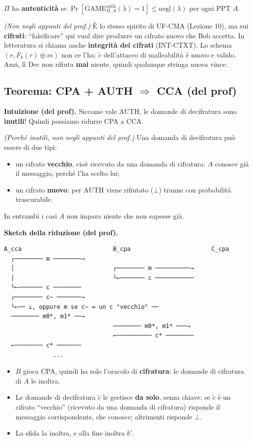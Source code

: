 \(\Pi\) ha \textbf{autenticità} se \(\Pr[\text{GAME}^{\text{auth}}_{\Pi, A}(\lambda) = 1] \le \text{negl}(\lambda)\) per ogni PPT \(A\).

\begin{nota}
\emph{(Non negli appunti del prof.)} È lo stesso spirito di UF-CMA (Lezione 10), ma sui \textbf{cifrati}: ``falsificare'' qui vuol dire produrre un cifrato nuovo che Bob accetta. In letteratura si chiama anche \textbf{integrità dei cifrati} (INT-CTXT). Lo schema \((r, F_k(r) \oplus m)\) non ce l'ha: \(\tilde{c}\) dell'attacco di malleabilità è nuovo e valido. Anzi, lì Dec non rifiuta \textbf{mai} niente, quindi qualunque stringa nuova vince.
\end{nota}

\subsection{Teorema: CPA + AUTH \texorpdfstring{\(\Rightarrow\)}{=>} CCA (del prof)}

\textbf{Intuizione (del prof).} Siccome vale AUTH, le domande di decifratura sono \textbf{inutili}! Quindi possiamo ridurre CPA a CCA.

\emph{(Perché inutili, non negli appunti del prof.)} Una domanda di decifratura può essere di due tipi:
\begin{itemize}
  \item un cifrato \textbf{vecchio}, cioè ricevuto da una domanda di cifratura: \(A\) conosce già il messaggio, perché l'ha scelto lui;
  \item un cifrato \textbf{nuovo}: per AUTH viene rifiutato (\(\bot\)) tranne con probabilità trascurabile.
\end{itemize}
In entrambi i casi \(A\) non impara niente che non sapesse già.

\textbf{Sketch della riduzione (del prof).}

\begin{verbatim}
A_cca                          B_cpa                       C_cpa
  ┌──────── m ────────→
  │                            ┌──────── m ──────────→
  │                            └←─────── c ───────────
  └←─────── c ────────
  ┌──────── c~ ───────→
  └←── ⊥, oppure m se c~ = un c "vecchio" ──
  ──────── m0*, m1* ──→
                               ──────── m0*, m1* ───→
                               ←────────── c* ────────
  ←──────── c* ───────
              ...
\end{verbatim}

\begin{itemize}
  \item \(B\) gioca CPA, quindi ha solo l'oracolo di \textbf{cifratura}: le domande di cifratura di \(A\) le inoltra.
  \item Le domande di decifratura \(\tilde{c}\) le gestisce \textbf{da solo}, senza chiave: se \(\tilde{c}\) è un cifrato ``vecchio'' (ricevuto da una domanda di cifratura) risponde il messaggio corrispondente, che conosce; altrimenti risponde \(\bot\).
  \item La sfida la inoltra, e alla fine inoltra \(b'\).
\end{itemize}

